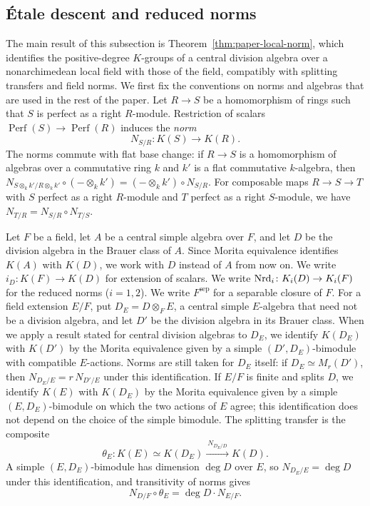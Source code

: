 \subsection{\'Etale descent and reduced norms}\label{sec:paper-local-norm}
The main result of this subsection is Theorem~\ref{thm:paper-local-norm}, which identifies the positive-degree $K$-groups of a central division algebra over a nonarchimedean local field with those of the field, compatibly with splitting transfers and field norms.
We first fix the conventions on norms and algebras that are used in the rest of the paper.
Let $R\to S$ be a homomorphism of rings such that $S$ is perfect as a right $R$-module.
Restriction of scalars $\operatorname{Perf}(S)\to\operatorname{Perf}(R)$ induces the \emph{norm}
\[
 N_{S/R}\colon K(S)\longrightarrow K(R).
\]
The norms commute with flat base change: if $R\to S$ is a homomorphism of algebras over a commutative ring $k$ and $k'$ is a flat commutative $k$-algebra, then $N_{S\otimes_kk'/R\otimes_kk'}\circ(-\otimes_kk')=(-\otimes_kk')\circ N_{S/R}$.
For composable maps $R\to S\to T$ with $S$ perfect as a right $R$-module and $T$ perfect as a right $S$-module, we have $N_{T/R}=N_{S/R}\circ N_{T/S}$.

Let $F$ be a field, let $A$ be a central simple algebra over $F$, and let $D$ be the division algebra in the Brauer class of $A$.
Since Morita equivalence identifies $K(A)$ with $K(D)$, we work with $D$ instead of $A$ from now on.
We write $i_D\colon K(F)\to K(D)$ for extension of scalars.
We write $\operatorname{Nrd}_i\colon K_i(D)\to K_i(F)$ for the reduced norms ($i=1,2$).
We write $F^{\mathrm{sep}}$ for a separable closure of $F$.
For a field extension $E/F$, put $D_E=D\otimes_FE$, a central simple $E$-algebra that need not be a division algebra, and let $D'$ be the division algebra in its Brauer class.
When we apply a result stated for central division algebras to $D_E$, we identify $K(D_E)$ with $K(D')$ by the Morita equivalence given by a simple $(D',D_E)$-bimodule with compatible $E$-actions.
Norms are still taken for $D_E$ itself: if $D_E\simeq M_r(D')$, then $N_{D_E/E}=r\,N_{D'/E}$ under this identification.
If $E/F$ is finite and splits $D$, we identify $K(E)$ with $K(D_E)$ by the Morita equivalence given by a simple $(E,D_E)$-bimodule on which the two actions of $E$ agree; this identification does not depend on the choice of the simple bimodule.
The splitting transfer is the composite
\[
 \theta_E\colon K(E)\simeq K(D_E)\xrightarrow{\ N_{D_E/D}\ }K(D).
\]
A simple $(E,D_E)$-bimodule has dimension $\deg D$ over $E$, so $N_{D_E/E}=\deg D$ under this identification, and transitivity of norms gives
\[
 N_{D/F}\circ\theta_E=\deg D\cdot N_{E/F}.
\]


